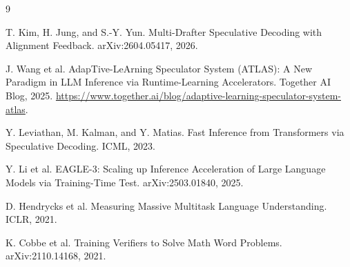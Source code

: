 \documentclass[11pt]{article}
\begin{document}
\footnotesize
\begin{thebibliography}{9}

T. Kim, H. Jung, and S.-Y. Yun.
\newblock Multi-Drafter Speculative Decoding with Alignment Feedback.
\newblock arXiv:2604.05417, 2026.

J. Wang et al.
\newblock AdapTive-LeArning Speculator System (ATLAS): A New Paradigm in LLM Inference via Runtime-Learning Accelerators.
\newblock Together AI Blog, 2025.
\newblock \url{https://www.together.ai/blog/adaptive-learning-speculator-system-atlas}.

Y. Leviathan, M. Kalman, and Y. Matias.
\newblock Fast Inference from Transformers via Speculative Decoding.
\newblock ICML, 2023.

Y. Li et al.
\newblock EAGLE-3: Scaling up Inference Acceleration of Large Language Models via Training-Time Test.
\newblock arXiv:2503.01840, 2025.

D. Hendrycks et al.
\newblock Measuring Massive Multitask Language Understanding.
\newblock ICLR, 2021.

K. Cobbe et al.
\newblock Training Verifiers to Solve Math Word Problems.
\newblock arXiv:2110.14168, 2021.

\end{thebibliography}
\end{document}

